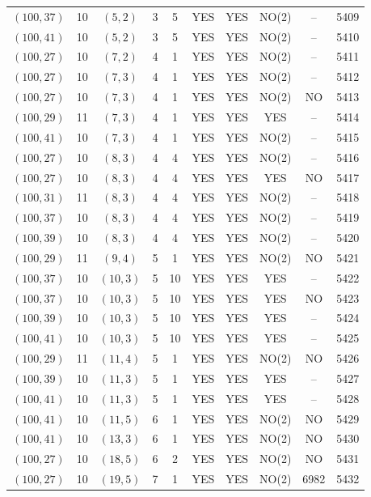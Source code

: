 \begin{longtable}{|c|c|c|c|c|c|c|c|c|c|}
$(100, 37)$ & 10 & $(5, 2)$ & 3 & 5 & YES & YES & NO(2) & -- & 5409\\
$(100, 41)$ & 10 & $(5, 2)$ & 3 & 5 & YES & YES & NO(2) & -- & 5410\\
$(100, 27)$ & 10 & $(7, 2)$ & 4 & 1 & YES & YES & NO(2) & -- & 5411\\
$(100, 27)$ & 10 & $(7, 3)$ & 4 & 1 & YES & YES & NO(2) & -- & 5412\\
$(100, 27)$ & 10 & $(7, 3)$ & 4 & 1 & YES & YES & NO(2) & NO & 5413\\
$(100, 29)$ & 11 & $(7, 3)$ & 4 & 1 & YES & YES & YES & -- & 5414\\
$(100, 41)$ & 10 & $(7, 3)$ & 4 & 1 & YES & YES & NO(2) & -- & 5415\\
$(100, 27)$ & 10 & $(8, 3)$ & 4 & 4 & YES & YES & NO(2) & -- & 5416\\
$(100, 27)$ & 10 & $(8, 3)$ & 4 & 4 & YES & YES & YES & NO & 5417\\
$(100, 31)$ & 11 & $(8, 3)$ & 4 & 4 & YES & YES & NO(2) & -- & 5418\\
$(100, 37)$ & 10 & $(8, 3)$ & 4 & 4 & YES & YES & NO(2) & -- & 5419\\
$(100, 39)$ & 10 & $(8, 3)$ & 4 & 4 & YES & YES & NO(2) & -- & 5420\\
$(100, 29)$ & 11 & $(9, 4)$ & 5 & 1 & YES & YES & NO(2) & NO & 5421\\
$(100, 37)$ & 10 & $(10, 3)$ & 5 & 10 & YES & YES & YES & -- & 5422\\
$(100, 37)$ & 10 & $(10, 3)$ & 5 & 10 & YES & YES & YES & NO & 5423\\
$(100, 39)$ & 10 & $(10, 3)$ & 5 & 10 & YES & YES & YES & -- & 5424\\
$(100, 41)$ & 10 & $(10, 3)$ & 5 & 10 & YES & YES & YES & -- & 5425\\
$(100, 29)$ & 11 & $(11, 4)$ & 5 & 1 & YES & YES & NO(2) & NO & 5426\\
$(100, 39)$ & 10 & $(11, 3)$ & 5 & 1 & YES & YES & YES & -- & 5427\\
$(100, 41)$ & 10 & $(11, 3)$ & 5 & 1 & YES & YES & YES & -- & 5428\\
$(100, 41)$ & 10 & $(11, 5)$ & 6 & 1 & YES & YES & NO(2) & NO & 5429\\
$(100, 41)$ & 10 & $(13, 3)$ & 6 & 1 & YES & YES & NO(2) & NO & 5430\\
$(100, 27)$ & 10 & $(18, 5)$ & 6 & 2 & YES & YES & NO(2) & NO & 5431\\
$(100, 27)$ & 10 & $(19, 5)$ & 7 & 1 & YES & YES & NO(2) & 6982 & 5432\\

\end{longtable}
